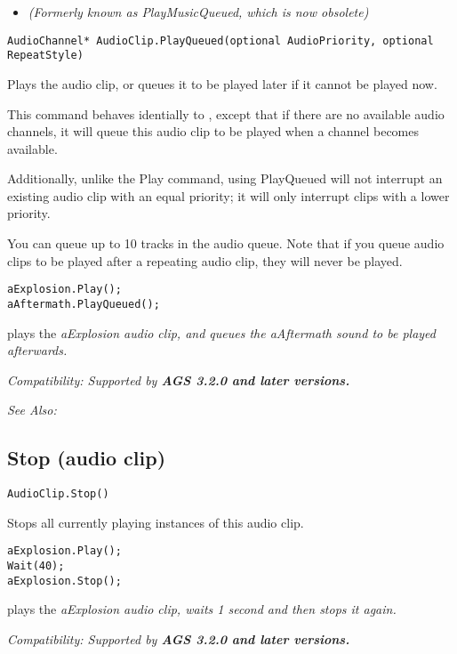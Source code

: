 \begin{itemize}
\item \it{(Formerly known as PlayMusicQueued, which is now obsolete)}
\end{itemize}

\begin{verbatim}
AudioChannel* AudioClip.PlayQueued(optional AudioPriority, optional RepeatStyle)
\end{verbatim}
Plays the audio clip, or queues it to be played later if it cannot be played now.

This command behaves identially to ,
except that if there are no available audio channels, it will queue this audio clip
to be played when a channel becomes available.

Additionally, unlike the Play command, using PlayQueued will not interrupt an existing audio
clip with an equal priority; it will only interrupt clips with a lower priority.

You can queue up to 10 tracks in the audio queue. Note that if you queue audio clips to
be played after a repeating audio clip, they will never be played.

\begin{verbatim}
aExplosion.Play();
aAftermath.PlayQueued();
\end{verbatim}
plays the \it{aExplosion} audio clip, and queues the \it{aAftermath} sound to be played
afterwards.

\it{Compatibility:} Supported by \bf{AGS 3.2.0} and later versions.

\it{See Also:} 


\subsection{Stop (audio clip)}\label{AudioClip.Stop}%

\begin{verbatim}
AudioClip.Stop()
\end{verbatim}
Stops all currently playing instances of this audio clip.

\begin{verbatim}
aExplosion.Play();
Wait(40);
aExplosion.Stop();
\end{verbatim}
plays the \it{aExplosion} audio clip, waits 1 second and then stops it again.

\it{Compatibility:} Supported by \bf{AGS 3.2.0} and later versions.

